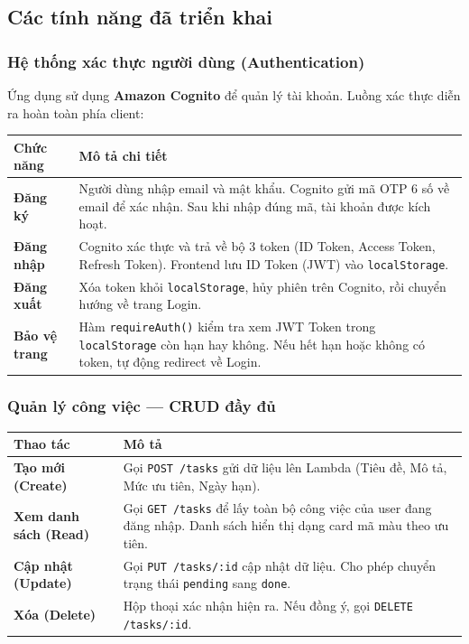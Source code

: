 \documentclass[13pt]{article}
\begin{document}
\subsection{Các tính năng đã triển khai}

\subsubsection{Hệ thống xác thực người dùng (Authentication)}
Ứng dụng sử dụng \textbf{Amazon Cognito} để quản lý tài khoản. Luồng xác thực diễn ra hoàn toàn phía client:

\begin{longtable}{|p{}|p{}|}
\hline
\textbf{Chức năng} & \textbf{Mô tả chi tiết} \\ \hline
\endhead
\textbf{Đăng ký} & Người dùng nhập email và mật khẩu. Cognito gửi mã OTP 6 số về email để xác nhận. Sau khi nhập đúng mã, tài khoản được kích hoạt. \\ \hline
\textbf{Đăng nhập} & Cognito xác thực và trả về bộ 3 token (ID Token, Access Token, Refresh Token). Frontend lưu ID Token (JWT) vào \texttt{localStorage}. \\ \hline
\textbf{Đăng xuất} & Xóa token khỏi \texttt{localStorage}, hủy phiên trên Cognito, rồi chuyển hướng về trang Login. \\ \hline
\textbf{Bảo vệ trang} & Hàm \texttt{requireAuth()} kiểm tra xem JWT Token trong \texttt{localStorage} còn hạn hay không. Nếu hết hạn hoặc không có token, tự động redirect về Login. \\ \hline
\end{longtable}

\subsubsection{Quản lý công việc — CRUD đầy đủ}

\begin{longtable}{|p{}|p{}|}
\hline
\textbf{Thao tác} & \textbf{Mô tả} \\ \hline
\endhead
\textbf{Tạo mới (Create)} & Gọi \texttt{POST /tasks} gửi dữ liệu lên Lambda (Tiêu đề, Mô tả, Mức ưu tiên, Ngày hạn). \\ \hline
\textbf{Xem danh sách (Read)} & Gọi \texttt{GET /tasks} để lấy toàn bộ công việc của user đang đăng nhập. Danh sách hiển thị dạng card mã màu theo ưu tiên. \\ \hline
\textbf{Cập nhật (Update)} & Gọi \texttt{PUT /tasks/:id} cập nhật dữ liệu. Cho phép chuyển trạng thái \texttt{pending} sang \texttt{done}. \\ \hline
\textbf{Xóa (Delete)} & Hộp thoại xác nhận hiện ra. Nếu đồng ý, gọi \texttt{DELETE /tasks/:id}. \\ \hline
\end{longtable}
\end{document}
